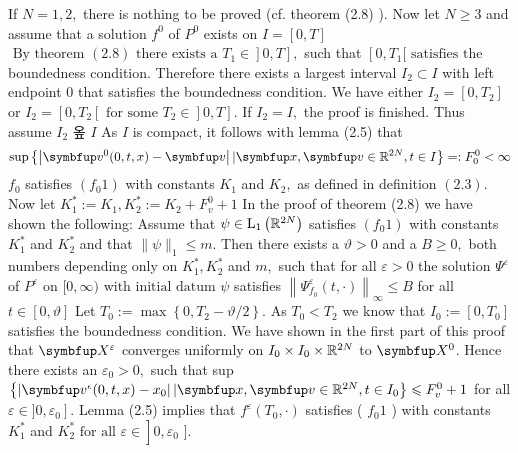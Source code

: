 \begin{lemma}
If $N=1,2,$ there is nothing to be proved (cf. theorem (2.8) ). Now let $N \geqslant 3$ and assume that a solution $f^{0}$ of $P^{0}$ exists on $I=[0, T]$ $\left.\text { By theorem }\left.(2.8) \text { there exists a } T_{1} \in\right] 0, T\right],$ such that $\left[0, T_{1}[ \text { satisfies the }\right.$ boundedness condition. Therefore there exists a largest interval $I_{2} \subset I$ with left endpoint 0 that satisfies the boundedness condition. We have either $I_{2}=\left[0, T_{2}\right]$ or $I_{2}=\left[0, T_{2}\left[\text { for some } T_{2} \in\right] 0, T\right] .$ If $I_{2}=I,$ the proof is finished. Thus assume $I_{2}$ 옾 $I$
As $I$ is compact, it follows with lemma (2.5) that
\[
\sup \left\{\left|\vv^{0}(0, t, x)-\vv\right| |\vx, \vv\in \bbR^{2 N}, t \in I\right\}=: F_{0}^{0}<\infty
\]
$f_{0}$ satisfies $(f_{0} 1)$ with constants $K_{1}$ and $K_{2},$ as defined in definition $(2.3) .$ Now let $K_{1}^{*}:=K_{1}, K_{2}^{*}:=K_{2}+F_{v}^{0}+1$
In the proof of theorem (2.8) we have shown the following: Assume that $\psi \in \mathrm{L}_{1}\left({\mathbb{R}}^{2 N}\right)$ satisfies $(f_{0} 1)$ with constants $K_{1}^{*}$ and $K_{2}^{*}$ and that $\|\psi\|_{1} \leqslant m$. Then there exists a $\vartheta>0$ and a $B \geqslant 0,$ both numbers depending only on $K_{1}^{*}, K_{2}^{*}$ and $m,$ such that for all $\varepsilon>0$ the solution $\Psi^{\varepsilon}$ of $P^{\varepsilon}$ on $[0, \infty)\text { with initial datum } \psi$ satisfies $\left\|\Psi_{f_{0}}^{\varepsilon}(t, \cdot)\right\|_{\infty} \leqslant B$ for all $t \in[0, \vartheta]$
Let $T_{0}:=\max \left\{0, T_{2}-\vartheta / 2\right\} .$ As $T_{0}<T_{2}$ we know that $I_{0}:=\left[0, T_{0}\right]$
satisfies the boundedness condition. We have shown in the first part of this proof that $\vect{X}^{\varepsilon}$ converges uniformly on $I_{0} \times I_{0} \times {\mathbb{R}}^{2 N}$ to $\vect{X}^{0}$. Hence there exists an $\varepsilon_{0}>0,$ such that sup $\left\{\left|\vv^{\epsilon}(0, t, x)-x_{0}\right| |\vx, \vv\in \bbR^{2 N}, t \in I_{0}\right\} \leqslant F_{v}^{0}+1$ for all
$\left.\varepsilon \in] 0, \varepsilon_{0}\right] .$ Lemma (2.5) implies that $f^{\varepsilon}\left(T_{0}, \cdot\right)$ satisfies ( $f_{0} 1$ ) with constants $K_{1}^{*}$ and $\left.K_{2}^{*} \text { for all } \varepsilon \in\right] 0, \varepsilon_{0}$ ].


\end{lemma}
